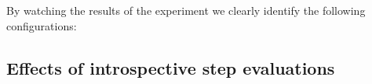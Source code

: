 By watching the results of the experiment we clearly identify the following configurations:
\begin{itemize}
\end{itemize}



\subsection{Effects of introspective step evaluations}

